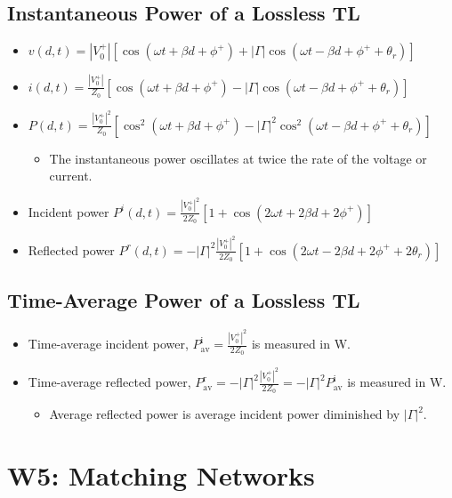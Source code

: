 \documentclass[a4paper]{article}
\begin{document}
\newpage
\subsection{Instantaneous Power of a Lossless TL}
\begin{itemize}
    \item $v(d, t) = |V_0^+|\left[\cos(\omega t+\beta d+\phi^+)+|\Gamma|\cos(\omega t-\beta d+\phi^++\theta_r)\right]$
    \item $i(d, t) = \displaystyle\frac{|V_0^+|}{Z_0}\left[\cos(\omega t+\beta d+\phi^+)-|\Gamma|\cos(\omega t-\beta d+\phi^++\theta_r)\right]$
    \item $P(d, t) = \displaystyle\frac{|V_0^+|^2}{Z_0}\left[\cos^2(\omega t+\beta d+\phi^+)-|\Gamma|^2\cos^2(\omega t-\beta d+\phi^++\theta_r)\right]$
    \begin{itemize}[label=$\circ$]
        \item The instantaneous power oscillates at twice the rate of the voltage or current.
    \end{itemize}
    \item Incident power $P^i(d, t) = \displaystyle\frac{|V_0^+|^2}{2Z_0}\left[1+\cos(2\omega t+2\beta d+2\phi^+)\right]$
    \item Reflected power $P^r(d, t) = -|\Gamma|^2\displaystyle\frac{|V_0^+|^2}{2Z_0}\left[1+\cos(2\omega t-2\beta d+2\phi^++2\theta_r)\right]$
\end{itemize}

\subsection{Time-Average Power of a Lossless TL}
\begin{itemize}
    \item Time-average incident power, $P^\text{i}_\text{av} = \displaystyle\frac{|V_0^+|^2}{2Z_0}$ is measured in W.
    \item Time-average reflected power, $P^\text{r}_\text{av} = -|\Gamma|^2\displaystyle\frac{|V_0^+|^2}{2Z_0} = -|\Gamma|^2P^\text{i}_\text{av}$ is measured in W.
    \begin{itemize}
        \item Average reflected power is average incident power diminished by $|\Gamma|^2$.
    \end{itemize}
\end{itemize}

\newpage
\section{W5: Matching Networks}
\end{document}
